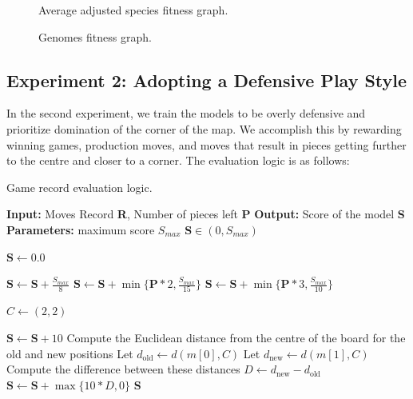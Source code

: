 \documentclass[letterpaper, 12pt]{article}
\begin{document}
\begin{figure}[H]
  \centering
  
  \caption{Average adjusted species fitness graph.}
  \label{fig:species_fit_aggr}
\end{figure}

\begin{figure}[H]
  \centering
  
  \caption{Genomes fitness graph.}
  \label{fig:genome_fit_aggr}
\end{figure}

\subsection{Experiment 2: Adopting a Defensive Play Style}
In the second experiment, we train the models to be overly defensive and prioritize
domination of the corner of the map. We accomplish this by rewarding winning games,
production moves, and moves that result in pieces getting further to the centre and
closer to a corner. The evaluation logic is as follows:

\begin{algorithm}[H]
\caption{Game record evaluation logic.}
\begin{algorithmic}[0]
  \State \textbf{Input:} Moves Record \textbf{R}, Number of pieces left \textbf{P}
  \State \textbf{Output:} Score of the model \textbf{S}
  \State \textbf{Parameters:} maximum score $S_{max}$
  \Ensure $\textbf{S} \in (0, S_{max})$

  \State $\textbf{S} \gets 0.0$ 

  \State $\textbf{S} \gets \textbf{S} + \frac{S_{max}}{8}$
  \State $\textbf{S} \gets \textbf{S} + \min \{\textbf{P} * 2, \frac{S_{max}}{15}\}$
  \State $\textbf{S} \gets \textbf{S} + \min \{\textbf{P} * 3, \frac{S_{max}}{10}\}$
  \EndIf
  
  \State $C \gets (2, 2)$ 

      \State $\textbf{S} \gets \textbf{S} + 10$
      \State Compute the Euclidean distance from the centre
      \State of the board for the old and new positions
      \State Let $d_{\text{old}} \gets d(m[0], C)$ 
      \State Let $d_{\text{new}} \gets d(m[1], C)$ 
      \State Compute the difference between these distances
      \State $D \gets d_{\text{new}} - d_{\text{old}}$
      \State $\textbf{S} \gets \textbf{S} + \max \{10 * D, 0\}$
    \EndIf
  \EndFor
  \State \Return \textbf{S}
\end{algorithmic}
\end{algorithm}
\end{document}
